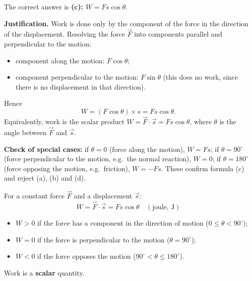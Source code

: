 \documentclass[11pt]{article}
\begin{document}
\begin{corrige}
The correct answer is \textbf{(c): $W = Fs\cos\theta$}.

\textbf{Justification.} Work is done only by the component of the force in the direction of the displacement. Resolving the force $\vec{F}$ into components parallel and perpendicular to the motion:
\begin{itemize}
\item component along the motion: $F\cos\theta$;
\item component perpendicular to the motion: $F\sin\theta$ (this does no work, since there is no displacement in that direction).
\end{itemize}
Hence
\[
W = (F\cos\theta)\times s = Fs\cos\theta.
\]
Equivalently, work is the scalar product $W = \vec{F}\cdot\vec{s} = Fs\cos\theta$, where $\theta$ is the angle between $\vec{F}$ and $\vec{s}$.

\textbf{Check of special cases:} if $\theta = 0$ (force along the motion), $W = Fs$; if $\theta = 90^{\circ}$ (force perpendicular to the motion, e.g.\ the normal reaction), $W = 0$; if $\theta = 180^{\circ}$ (force opposing the motion, e.g.\ friction), $W = -Fs$. These confirm formula (c) and reject (a), (b) and (d).

\begin{aretenir}
For a constant force $\vec{F}$ and a displacement $\vec{s}$:
\[
W = \vec{F}\cdot\vec{s} = Fs\cos\theta \quad (\text{joule, J})
\]
\begin{itemize}
\item $W>0$ if the force has a component in the direction of motion ($0\le\theta<90^{\circ}$);
\item $W=0$ if the force is perpendicular to the motion ($\theta=90^{\circ}$);
\item $W<0$ if the force opposes the motion ($90^{\circ}<\theta\le180^{\circ}$).
\end{itemize}
Work is a \textbf{scalar} quantity.
\end{aretenir}
\end{corrige}
\end{document}
